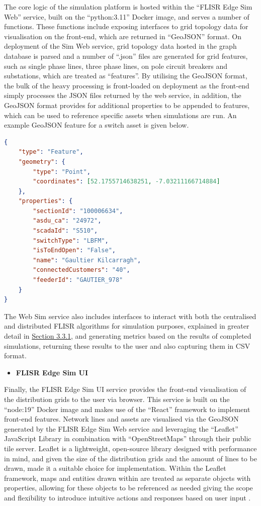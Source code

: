 \noindent The core logic of the simulation platform is hosted within the ``FLISR Edge Sim Web'' service, built on the ``python:3.11'' Docker image, and serves a number of functions.
These functions include exposing interfaces to grid topology data for visualisation on the front-end, which are returned in ``GeoJSON'' format. On deployment of the Sim Web service,
grid topology data hosted in the graph database is parsed and a number of ``.json'' files are generated for grid features, such as single phase lines, three phase lines, on pole
circuit breakers and substations, which are treated as ``features''. By utilising the GeoJSON format, the bulk of the heavy processing is front-loaded on deployment
 as the front-end simply processes the JSON files returned by the web service, in addition, the GeoJSON format provides for additional properties to be appended to features, which can
 be used to reference specific assets when simulations are run. An example GeoJSON feature for a switch asset is given below.
\clearpage
\begin{lstlisting}[language=json]
{
	"type": "Feature",
	"geometry": {
		"type": "Point",
		"coordinates": [52.1755714638251, -7.03211166714884]
	},
	"properties": {
		"sectionId": "100006634",
		"asdu_ca": "24972",
		"scadaId": "S510",
		"switchType": "LBFM",
		"isToEndOpen": "False",
		"name": "Gaultier Kilcarragh",
		"connectedCustomers": "40",
		"feederId": "GAUTIER_978"
	}
}
\end{lstlisting}

\noindent The Web Sim service also includes interfaces to interact with both the centralised and distributed FLISR algorithms for simulation purposes, explained in greater detail in \hyperref[sec:simulation_platform]{Section 3.3.1},
and generating metrics based on the results of completed simulations, returning these results to the user and also capturing them in CSV format.

\begin{itemize}
  \item \textbf{FLISR Edge Sim UI}
\end{itemize}

\noindent Finally, the FLISR Edge Sim UI service provides the front-end visualisation of the distribution grids to the user via browser. This service is built on the ``node:19'' Docker image and makes use
of the ``React'' framework to implement front-end features. Network lines and assets are visualised via the GeoJSON generated by the FLISR Edge Sim Web service
and leveraging the ``Leaflet'' JavaScript Library in combination with ``OpenStreetMaps'' through their public tile server. Leaflet is a lightweight, open-source library designed with performance in mind, and given the size of the distribution grids and the amount of lines to be drawn, made
it a suitable choice for implementation. Within the Leaflet framework, maps and entities drawn within are treated as separate objects with properties, allowing for these objects to be referenced as needed giving the scope
and flexibility to introduce intuitive actions and responses based on user input \cite{crickard2014leaflet}.

